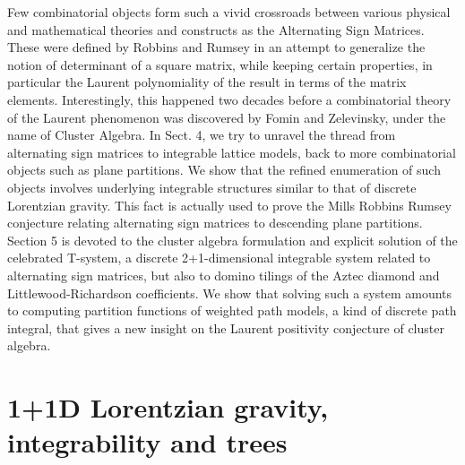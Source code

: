 \documentclass[12pt]{amsart}
\numberwithin{equation}{section}
\begin{document}
Few combinatorial objects form such a vivid crossroads between various physical and mathematical theories and constructs
as the Alternating Sign Matrices\cite{Bressoud}. These were defined by Robbins and Rumsey\cite{RR} in an attempt to generalize the notion
of determinant of a square matrix, while keeping certain properties, in particular the Laurent polynomiality of the
result in terms of the matrix elements. Interestingly, this happened two decades before a combinatorial theory
of the Laurent phenomenon was discovered by Fomin and Zelevinsky, under the name of Cluster Algebra\cite{FZI}. 
In Sect. 4, we try to unravel the thread from alternating sign matrices to integrable lattice models, back to more combinatorial
objects such as plane partitions. We show that the refined enumeration of such objects involves underlying integrable
structures similar to that of discrete Lorentzian  gravity. This fact is actually used to prove the 
Mills Robbins Rumsey conjecture\cite{MRR}
relating alternating sign matrices to descending plane partitions.
Section 5 is devoted to the cluster algebra formulation and explicit solution
of the celebrated T-system\cite{KNS}, a discrete 2+1-dimensional integrable system\cite{KLWZ} related
to alternating sign matrices, but also to domino tilings of the Aztec diamond\cite{EKLP,SPY} and 
Littlewood-Richardson coefficients\cite{KTW}. 
We show that solving such a system amounts to computing partition functions of weighted path
models, a kind of discrete path integral, that gives a new insight on the Laurent positivity conjecture of cluster algebra.

\section{1+1D Lorentzian gravity, integrability and trees}\label{lorsec}
\end{document}
